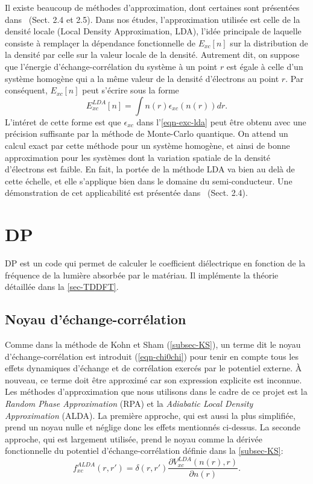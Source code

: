 Il existe beaucoup de méthodes d'approximation,
dont certaines sont présentées dans~\cite{Sottile2003} (Sect. 2.4 et 2.5).
Dans nos études, l'approximation utilisée est celle de la densité locale (Local Density Approximation, LDA),
l'idée principale de laquelle consiste à remplaçer la dépendance fonctionnelle de $E_{xc}[n]$
sur la distribution de la densité par celle sur la valeur locale de la densité.
Autrement dit, on suppose que l'énergie d'échange-corrélation du système à un point $r$
est égale à celle d'un système homogène qui a la même valeur de la densité d'électrons au point $r$.
Par conséquent, $E_{xc}[n]$ peut s'écrire sous la forme
\begin{equation}
  \label{eqn-exc-lda}
  E_{xc}^{LDA}[n] = \int n(r)\epsilon_{xc}(n(r)) dr.
\end{equation}
L'intéret de cette forme est que $\epsilon_{xc}$ dans l'\cref{eqn-exc-lda} peut être obtenu avec
une précision suffisante par la méthode de Monte-Carlo quantique.
On attend un calcul exact par cette méthode pour un système homogène,
et ainsi de bonne approximation pour les systèmes dont la variation spatiale de la densité d'électrons est faible.
En fait, la portée de la méthode LDA va bien au delà de cette échelle,
et elle s'applique bien dans le domaine du semi-conducteur.
Une démonstration de cet applicabilité est présentée dans~\cite{Sottile2003} (Sect. 2.4).

\section{DP}
DP est un code qui permet de calculer le coefficient diélectrique
en fonction de la fréquence de la lumière absorbée par le matériau.
Il implémente la théorie détaillée dans la \cref{sec-TDDFT}.

\subsection{Noyau d'échange-corrélation}
Comme dans la méthode de Kohn et Sham (\cref{subsec-KS}),
un terme dit le noyau d'échange-corrélation est introduit (\cref{eqn-chi0chi})
pour tenir en compte tous les effets dynamiques d'échange et de corrélation
exercés par le potentiel externe.
À nouveau, ce terme doit être approximé car son expression explicite est inconnue.
Les méthodes d'approximation que nous utilisons dans le cadre de ce projet est
la \textit{Random Phase Approximation} (RPA) et
la \textit{Adiabatic Local Density Approximation} (ALDA).
La première approche, qui est aussi la plus simplifiée, prend un noyau nulle et
néglige donc les effets mentionnés ci-dessus.
La seconde approche, qui est largement utilisée,
prend le noyau comme la dérivée fonctionnelle du potentiel d'échange-corrélation
définie dans la \cref{subsec-KS}:
\begin{equation}
  f_{xc}^{ALDA}(r, r') = \delta(r, r')\frac{\partial V_{xc}^{LDA}(n(r), r)}{\partial n(r)}.
\end{equation}


